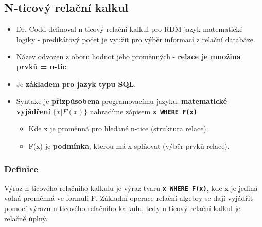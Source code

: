 \subsection{N-ticový relační kalkul}
\begin{itemize}
\item Dr. Codd definoval n-ticový relační kalkul pro RDM jazyk matematické logiky - predikátový počet je využit pro výběr informací z relační databáze.
\item Název odvozen z oboru hodnot jeho proměnných - \textbf{relace je množina prvků = n-tic}.
\item Je \textbf{základem pro jazyk typu SQL}.
\item Syntaxe je \textbf{přizpůsobena} programovacímu jazyku: \textbf{matematické vyjádření} $\{ x | F(x) \}$ nahradíme zápisem \textbf{\texttt{x WHERE  F(x)}}
\begin{itemize}
\item Kde x je proměnná pro hledané n-tice (struktura relace).
\item F(x) je \textbf{podmínka}, kterou má x splňovat (výběr prvků relace).
\end{itemize}
\end{itemize}

\subsubsection{Definice}
Výraz n-ticového relačního kalkulu je výraz tvaru \textbf{\texttt{x WHERE F(x)}}, kde x je jediná volná proměnná ve formuli F. Základní operace relační algebry se dají vyjádřit pomocí výrazů n-ticového relačního kalkulu, tedy n-ticový relační kalkul je relačně úplný.

\noindent{}


